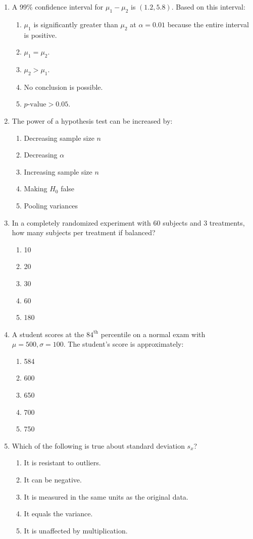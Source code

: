 \begin{enumerate}[resume, leftmargin=1.5em]
  \item A 99\% confidence interval for $\mu_1 - \mu_2$ is $(1.2, 5.8)$. Based on this interval:
  \begin{enumerate}[label=(\Alph*)]
    \item $\mu_1$ is significantly greater than $\mu_2$ at $\alpha = 0.01$ because the entire interval is positive.
    \item $\mu_1 = \mu_2$.
    \item $\mu_2 > \mu_1$.
    \item No conclusion is possible.
    \item $p\text{-value} > 0.05$.
  \end{enumerate}

  \item The power of a hypothesis test can be increased by:
  \begin{enumerate}[label=(\Alph*)]
    \item Decreasing sample size $n$ \item Decreasing $\alpha$ \item Increasing sample size $n$ \item Making $H_0$ false \item Pooling variances
  \end{enumerate}

  \item In a completely randomized experiment with 60 subjects and 3 treatments, how many subjects per treatment if balanced?
  \begin{enumerate}[label=(\Alph*)]
    \item 10 \item 20 \item 30 \item 60 \item 180
  \end{enumerate}

  \item A student scores at the $84^{\text{th}}$ percentile on a normal exam with $\mu = 500, \sigma = 100$. The student's score is approximately:
  \begin{enumerate}[label=(\Alph*)]
    \item 584 \item 600 \item 650 \item 700 \item 750
  \end{enumerate}

  \item Which of the following is true about standard deviation $s_x$?
  \begin{enumerate}[label=(\Alph*)]
    \item It is resistant to outliers. \item It can be negative. \item It is measured in the same units as the original data. \item It equals the variance. \item It is unaffected by multiplication.
  \end{enumerate}


\end{enumerate}
